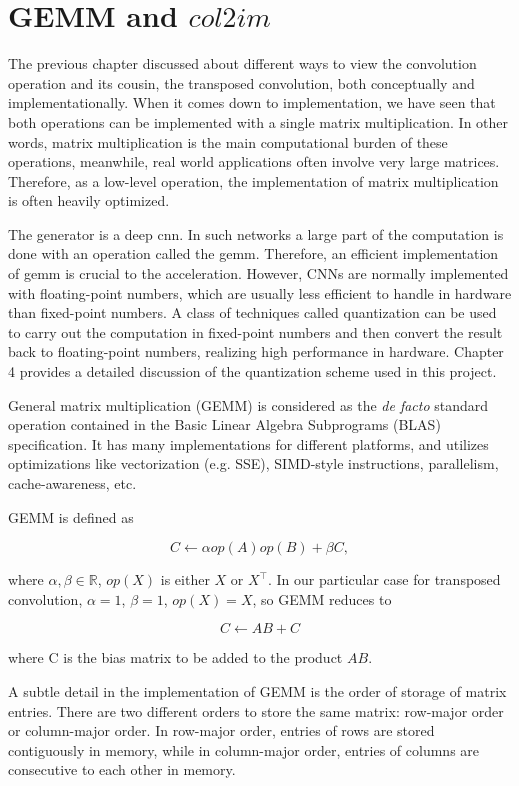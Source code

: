 
\chapter{GEMM and $col2im$}

The previous chapter discussed about different ways to view the convolution operation and its cousin,
the transposed convolution, both conceptually and implementationally. When it comes down to implementation,
we have seen that both operations can be implemented with a single matrix multiplication. In other words,
matrix multiplication is the main computational burden of these operations, meanwhile, real world applications
often involve very large matrices. Therefore, as a low-level operation, the implementation of matrix
multiplication is often heavily optimized.

The generator is a deep \gls{cnn}. In such networks a large part of the computation is done with an
operation called the \gls{gemm}. Therefore, an efficient implementation of \gls{gemm} is crucial to the
acceleration. However, CNNs are normally implemented with floating-point numbers, which are usually less
efficient to handle in hardware than fixed-point numbers. A class of techniques called quantization can
be used to carry out the computation in fixed-point numbers and then convert the result back to
floating-point numbers, realizing high performance in hardware. Chapter 4 provides a detailed discussion
of the quantization scheme used in this project.

General matrix multiplication (GEMM) is considered as the \textit{de facto} standard operation
contained in the Basic Linear Algebra Subprograms (BLAS) specification. It has many implementations for
different platforms, and utilizes optimizations like vectorization (e.g. SSE), SIMD-style instructions,
parallelism, cache-awareness, etc.

GEMM is defined as

$$C \leftarrow \alpha op(A) op(B) + \beta C,$$

where $\alpha, \beta \in \mathbb{R}$, $op(X)$ is either $X$ or $X^\intercal$. In our particular case for transposed convolution, $\alpha = 1$, $\beta = 1$, $op(X) = X$, so GEMM reduces to

$$C \leftarrow A B + C$$

where C is the bias matrix to be added to the product $A B$.

A subtle detail in the implementation of GEMM is the order of storage of matrix entries. There are two
different orders to store the same matrix: row-major order or column-major order. In row-major order,
entries of rows are stored contiguously in memory, while in column-major order, entries of columns are
consecutive to each other in memory.

